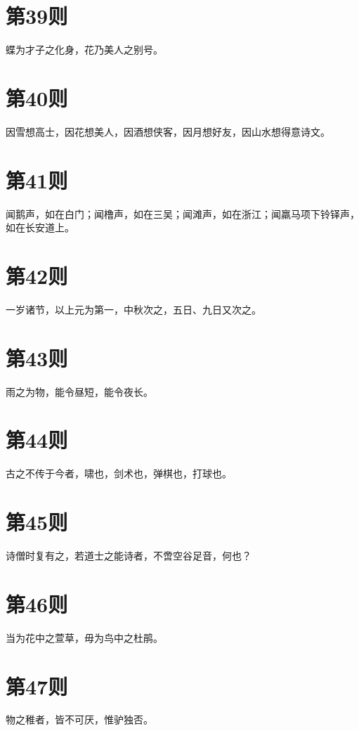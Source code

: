 \documentclass[12pt,a4paper]{ctexbook}
\begin{document}
\section{第39则}
蝶为才子之化身，花乃美人之别号。\par

\section{第40则}
因雪想高士，因花想美人，因酒想侠客，因月想好友，因山水想得意诗文。\par

\section{第41则}
闻鹅声，如在白门；闻橹声，如在三吴；闻滩声，如在浙江；闻羸马项下铃铎声，如在长安道上。\par

\section{第42则}
一岁诸节，以上元为第一，中秋次之，五日、九日又次之。\par

\section{第43则}
雨之为物，能令昼短，能令夜长。\par

\section{第44则}
古之不传于今者，啸也，剑术也，弹棋也，打球也。\par

\section{第45则}
诗僧时复有之，若道士之能诗者，不啻空谷足音，何也？\par

\section{第46则}
当为花中之萱草，毋为鸟中之杜鹃。\par

\section{第47则}
物之稚者，皆不可厌，惟驴独否。\par
\end{document}
